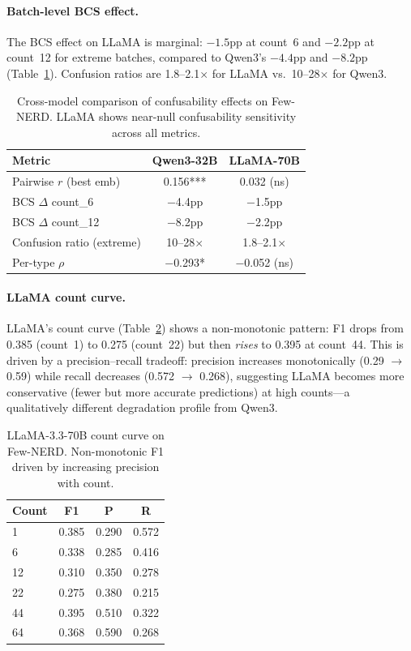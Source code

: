 \documentclass[11pt,a4paper]{article}
\begin{document}
\paragraph{Batch-level BCS effect.} The BCS effect on LLaMA is marginal: $-1.5$pp at count~6 and $-2.2$pp at count~12 for extreme batches, compared to Qwen3's $-4.4$pp and $-8.2$pp (Table~\ref{tab:crossmodel_bcs}). Confusion ratios are 1.8--2.1$\times$ for LLaMA vs.\ 10--28$\times$ for Qwen3.

\begin{table}[t]
\centering
\small
\begin{tabular}{lcc}
\toprule
Metric & Qwen3-32B & LLaMA-70B \\
\midrule
Pairwise $r$ (best emb) & 0.156*** & 0.032 (ns) \\
BCS $\Delta$ count\_6 & $-$4.4pp & $-$1.5pp \\
BCS $\Delta$ count\_12 & $-$8.2pp & $-$2.2pp \\
Confusion ratio (extreme) & 10--28$\times$ & 1.8--2.1$\times$ \\
Per-type $\rho$ & $-$0.293* & $-$0.052 (ns) \\
\bottomrule
\end{tabular}
\caption{Cross-model comparison of confusability effects on Few-NERD. LLaMA shows near-null confusability sensitivity across all metrics.}
\label{tab:crossmodel_bcs}
\end{table}

\paragraph{LLaMA count curve.} LLaMA's count curve (Table~\ref{tab:llama_count}) shows a non-monotonic pattern: F1 drops from 0.385 (count~1) to 0.275 (count~22) but then \emph{rises} to 0.395 at count~44. This is driven by a precision--recall tradeoff: precision increases monotonically (0.29 $\to$ 0.59) while recall decreases (0.572 $\to$ 0.268), suggesting LLaMA becomes more conservative (fewer but more accurate predictions) at high counts---a qualitatively different degradation profile from Qwen3.

\begin{table}[t]
\centering
\small
\begin{tabular}{lccc}
\toprule
Count & F1 & P & R \\
\midrule
1 & 0.385 & 0.290 & 0.572 \\
6 & 0.338 & 0.285 & 0.416 \\
12 & 0.310 & 0.350 & 0.278 \\
22 & 0.275 & 0.380 & 0.215 \\
44 & 0.395 & 0.510 & 0.322 \\
64 & 0.368 & 0.590 & 0.268 \\
\bottomrule
\end{tabular}
\caption{LLaMA-3.3-70B count curve on Few-NERD. Non-monotonic F1 driven by increasing precision with count.}
\label{tab:llama_count}
\end{table}
\end{document}
